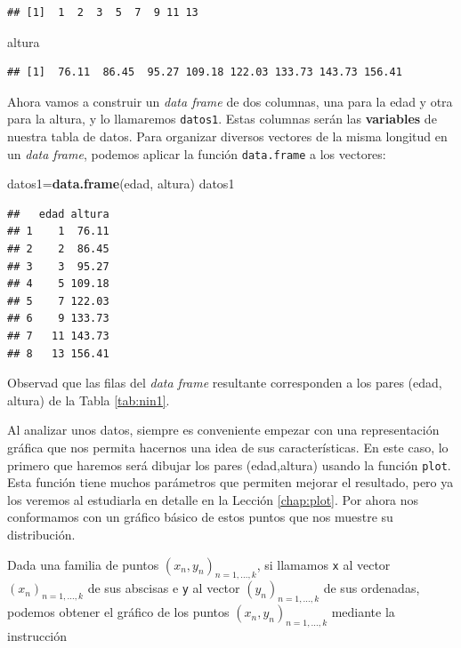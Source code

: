 \documentclass[]{book}
\newenvironment{Shaded}{\begin{snugshade}}{\end{snugshade}}
\newcommand{\KeywordTok}[1]{\textcolor[rgb]{0.13,0.29,0.53}{\textbf{#1}}}
\newcommand{\NormalTok}[1]{#1}
\theoremstyle{definition}
\theoremstyle{definition}
\theoremstyle{definition}
\theoremstyle{remark}
\begin{document}
\begin{verbatim}
## [1]  1  2  3  5  7  9 11 13
\end{verbatim}

\begin{Shaded}
\begin{Highlighting}[]
\NormalTok{altura}
\end{Highlighting}
\end{Shaded}

\begin{verbatim}
## [1]  76.11  86.45  95.27 109.18 122.03 133.73 143.73 156.41
\end{verbatim}

Ahora vamos a construir un \emph{data frame} de dos columnas, una para la edad y otra para la altura, y lo llamaremos \texttt{datos1}. Estas columnas serán las \textbf{variables} de nuestra tabla de datos.
Para organizar diversos vectores de la misma longitud en un \emph{data frame}, podemos aplicar la función \texttt{data.frame} a los vectores:

\begin{Shaded}
\begin{Highlighting}[]
\NormalTok{datos1=}\KeywordTok{data.frame}\NormalTok{(edad, altura)}
\NormalTok{datos1}
\end{Highlighting}
\end{Shaded}

\begin{verbatim}
##   edad altura
## 1    1  76.11
## 2    2  86.45
## 3    3  95.27
## 4    5 109.18
## 5    7 122.03
## 6    9 133.73
## 7   11 143.73
## 8   13 156.41
\end{verbatim}

Observad que las filas del \emph{data frame} resultante corresponden a los pares (edad, altura) de la Tabla \ref{tab:nin1}.

Al analizar unos datos, siempre es conveniente empezar con una representación gráfica que nos permita hacernos una idea de sus características. En este caso, lo primero que haremos será dibujar los pares (edad,altura) usando la función \texttt{plot}. Esta función tiene muchos parámetros que permiten mejorar el resultado, pero ya los veremos al estudiarla en detalle en la Lección \ref{chap:plot}. Por ahora nos conformamos con un gráfico básico de estos puntos que nos muestre su distribución.

Dada una familia de puntos \((x_n,y_n)_{n=1,\ldots,k}\), si llamamos \texttt{x} al vector \((x_n)_{n=1,\ldots,k}\) de sus abscisas e \texttt{y} al vector \((y_n)_{n=1,\ldots,k}\) de sus ordenadas, podemos obtener el gráfico de los puntos \((x_n,y_n)_{n=1,\ldots,k}\) mediante la instrucción
\end{document}
